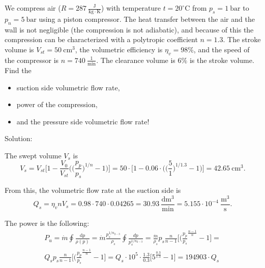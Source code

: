 \vspace{1cm}

We compress air ($R=287~\frac{\mathrm{J}}{\mathrm{kg\cdot K}}$) with temperature $t=20^\circ \mathrm{C}$ from $p_s=1~\mathrm{bar}$ to $p_n = 5~\mathrm{bar}$ using a piston compressor. The heat transfer between the air and the wall is not negligible (the compression is not adiabatic), and because of this the compression can be characterized with a polytropic coefficient $n=1.3$. The stroke volume is $V_{st} = 50~\mathrm{cm^3}$, the volumetric efficiency is $\eta_v = 98\%$, and the speed of the compressor is $n=740~\frac{1}{\mathrm{min}}$. The clearance volume is $6\%$ is the stroke volume. Find the
\begin{itemize}
\item suction side volumetric flow rate,
\item power of the compression, 
\item and the pressure side volumetric flow rate!
\end{itemize}

Solution:

The swept volume $V_s$ is 
\begin{equation}
V_s = V_{st} \Bigg[1-\frac{V_0}{V_{st}} \Bigg( \Big(\frac{p_p}{p_s}\Big)^{1/n} - 1 \Bigg) \Bigg] = 50\cdot \Bigg[1-0.06\cdot \Bigg( \Big(\frac{5}{1}\Big)^{1/1.3} - 1 \Bigg) \Bigg] = 42.65~\mathrm{cm^3}.
\end{equation}

From this, the volumetric flow rate at the suction side is
\begin{equation}
Q_s = \eta_v n V_s = 0.98\cdot 740 \cdot 0.04265 = 30.93~\frac{\mathrm{dm^3}}{\mathrm{min}} = 5.155\cdot 10^{-4}~\frac{\mathrm{m^3}}{\mathrm{s}}.
\end{equation}

The power is the following:
\begin{multline}
P_u = \dot{m} \oint \frac{\mathrm{d}p}{\rho(p)} = \dot{m} \frac{p_s^{1/n_{2-3}}}{\rho_s} \oint \frac{dp}{p_s^{1/n_{2-3}}} = \frac{\dot{m}}{\rho_s} p_s \frac{n}{n-1} \Bigg[ \Big(\frac{p_p}{p_s}^{\frac{n-1}{n}} -1 \Bigg] = \\
Q_s p_s \frac{n}{n-1} \Bigg[ \Big(\frac{p_p}{p_s}^{\frac{n-1}{n}} -1 \Bigg] = Q_s \cdot 10^5 \cdot \frac{1.3}{0.3} \Big[ 5^{\frac{0.3}{1.3}}-1\Big] = 194903\cdot Q_s
\end{multline}

